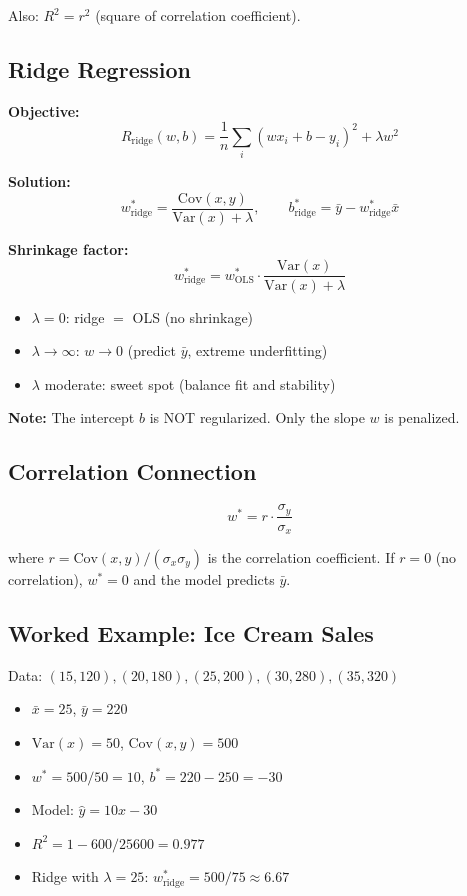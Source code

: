 \documentclass[11pt,a4paper]{article}
\begin{document}
Also: $R^2 = r^2$ (square of correlation coefficient).

\subsection{Ridge Regression}

\textbf{Objective:}
$$R_{\text{ridge}}(w, b) = \frac{1}{n}\sum_i (wx_i + b - y_i)^2 + \lambda w^2$$

\textbf{Solution:}
$$w^*_{\text{ridge}} = \frac{\text{Cov}(x,y)}{\text{Var}(x) + \lambda}, \qquad b^*_{\text{ridge}} = \bar{y} - w^*_{\text{ridge}}\bar{x}$$

\textbf{Shrinkage factor:}
$$w^*_{\text{ridge}} = w^*_{\text{OLS}} \cdot \frac{\text{Var}(x)}{\text{Var}(x) + \lambda}$$

\begin{itemize}
    \item $\lambda = 0$: ridge $=$ OLS (no shrinkage)
    \item $\lambda \to \infty$: $w \to 0$ (predict $\bar{y}$, extreme underfitting)
    \item $\lambda$ moderate: sweet spot (balance fit and stability)
\end{itemize}

\textbf{Note:} The intercept $b$ is NOT regularized. Only the slope $w$ is penalized.

\subsection{Correlation Connection}

$$w^* = r \cdot \frac{\sigma_y}{\sigma_x}$$

where $r = \text{Cov}(x,y)/(\sigma_x \sigma_y)$ is the correlation coefficient. If $r = 0$ (no correlation), $w^* = 0$ and the model predicts $\bar{y}$.

\subsection{Worked Example: Ice Cream Sales}

Data: $(15, 120), (20, 180), (25, 200), (30, 280), (35, 320)$

\begin{itemize}
    \item $\bar{x} = 25$, $\bar{y} = 220$
    \item $\text{Var}(x) = 50$, $\text{Cov}(x,y) = 500$
    \item $w^* = 500/50 = 10$, $b^* = 220 - 250 = -30$
    \item Model: $\hat{y} = 10x - 30$
    \item $R^2 = 1 - 600/25600 = 0.977$
    \item Ridge with $\lambda = 25$: $w^*_{\text{ridge}} = 500/75 \approx 6.67$
\end{itemize}
\end{document}
